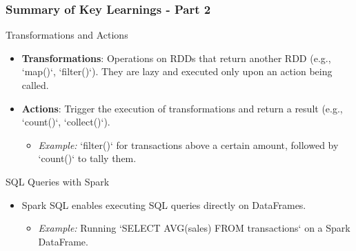 \documentclass[aspectratio=169]{beamer}
\begin{document}
\begin{frame}[fragile]
  \frametitle{Summary of Key Learnings - Part 2}
  \begin{block}{Transformations and Actions}
      \begin{itemize}
          \item \textbf{Transformations}: Operations on RDDs that return another RDD (e.g., `map()`, `filter()`). They are lazy and executed only upon an action being called.
          \item \textbf{Actions}: Trigger the execution of transformations and return a result (e.g., `count()`, `collect()`).
          \begin{itemize}
              \item \textit{Example:} `filter()` for transactions above a certain amount, followed by `count()` to tally them.
          \end{itemize}
      \end{itemize}
  \end{block}

  \begin{block}{SQL Queries with Spark}
      \begin{itemize}
          \item Spark SQL enables executing SQL queries directly on DataFrames.
          \begin{itemize}
              \item \textit{Example:} Running `SELECT AVG(sales) FROM transactions` on a Spark DataFrame.
          \end{itemize}
      \end{itemize}
  \end{block}
\end{frame}
\end{document}
